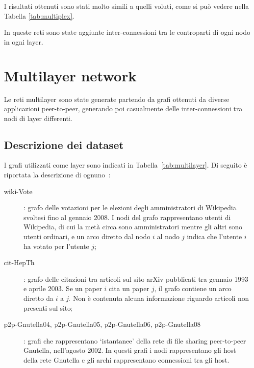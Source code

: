 I risultati ottenuti sono stati molto simili a quelli voluti, come si può vedere nella Tabella \vref{tab:multiplex}.

In queste reti sono state aggiunte inter-connessioni tra le controparti di ogni nodo in ogni layer.



\section{Multilayer network}
Le reti multilayer sono state generate partendo da grafi ottenuti da 
diverse applicazioni peer-to-peer, generando poi casualmente delle inter-connessioni 
tra nodi di layer differenti.  

\subsection{Descrizione dei dataset}
I grafi utilizzati come layer sono indicati in Tabella~\vref{tab:multilayer}.
Di seguito è riportata la descrizione di ognuno~\cite{data:multilayer}:

\begin{description}
    \item[wiki-Vote]: grafo delle votazioni per le elezioni degli amministratori 
    di Wikipedia svoltesi fino al gennaio 2008.
    I nodi del grafo rappresentano utenti di Wikipedia, di cui la metà circa sono 
    amministratori mentre gli altri sono utenti ordinari, e un arco diretto dal nodo 
    $i$ al nodo $j$ indica che l'utente $i$ ha votato per l'utente $j$;

    \item[cit-HepTh]: grafo delle citazioni tra articoli sul sito arXiv
    pubblicati tra gennaio 1993 e aprile 2003.
    Se un paper $i$ cita un paper $j$, il grafo contiene un arco diretto 
    da $i$ a $j$. Non è contenuta alcuna informazione riguardo articoli non 
    presenti sul sito;

    \item[p2p-Gnutella04\textnormal{,} p2p-Gnutella05\textnormal{,} p2p-Gnutella06\textnormal{,} p2p-Gnutella08]: 
    grafi che rappresentano `istantanee' della rete di file sharing peer-to-peer Gnutella, nell'agosto 2002.
    In questi grafi i nodi rappresentano gli host della rete Gnutella e gli archi 
    rappresentano connessioni tra gli host.

\end{description}



